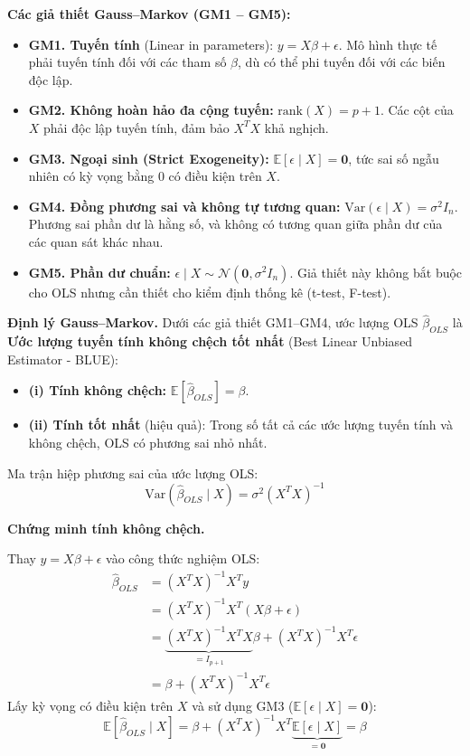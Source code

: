 \documentclass[a4paper]{article}
\begin{document}
\textbf{Các giả thiết Gauss--Markov (GM1 -- GM5):}
\begin{itemize}
    \item \textbf{GM1. Tuyến tính} (Linear in parameters): $y = X\beta + \epsilon$. Mô hình thực tế phải tuyến tính đối với các tham số $\beta$, dù có thể phi tuyến đối với các biến độc lập.
    \item \textbf{GM2. Không hoàn hảo đa cộng tuyến:} $\text{rank}(X) = p + 1$. Các cột của $X$ phải độc lập tuyến tính, đảm bảo $X^TX$ khả nghịch.
    \item \textbf{GM3. Ngoại sinh (Strict Exogeneity):} $\mathbb{E}[\epsilon \mid X] = \mathbf{0}$, tức sai số ngẫu nhiên có kỳ vọng bằng 0 có điều kiện trên $X$.
    \item \textbf{GM4. Đồng phương sai và không tự tương quan:} $\text{Var}(\epsilon \mid X) = \sigma^2 I_n$. Phương sai phần dư là hằng số, và không có tương quan giữa phần dư của các quan sát khác nhau.
    \item \textbf{GM5. Phần dư chuẩn:} $\epsilon \mid X \sim \mathcal{N}(\mathbf{0}, \sigma^2 I_n)$. Giả thiết này không bắt buộc cho OLS nhưng cần thiết cho kiểm định thống kê (t-test, F-test).
\end{itemize}

\textbf{Định lý Gauss--Markov.} Dưới các giả thiết GM1--GM4, ước lượng OLS $\hat{\beta}_{OLS}$ là \textbf{Ước lượng tuyến tính không chệch tốt nhất} (Best Linear Unbiased Estimator - BLUE):
\begin{itemize}
    \item \textbf{(i) Tính không chệch:} $\mathbb{E}[\hat{\beta}_{OLS}] = \beta$.
    \item \textbf{(ii) Tính tốt nhất} (hiệu quả): Trong số tất cả các ước lượng tuyến tính và không chệch, OLS có phương sai nhỏ nhất.
\end{itemize}

Ma trận hiệp phương sai của ước lượng OLS:
\begin{equation}
\text{Var}(\hat{\beta}_{OLS} \mid X) = \sigma^2 (X^TX)^{-1}
\end{equation}

\textbf{Chứng minh tính không chệch.}

Thay $y = X\beta + \epsilon$ vào công thức nghiệm OLS:
\begin{align*}
\hat{\beta}_{OLS} &= (X^TX)^{-1}X^Ty \\
                   &= (X^TX)^{-1}X^T(X\beta + \epsilon) \\
                   &= \underbrace{(X^TX)^{-1}X^TX}_{=I_{p+1}}\beta + (X^TX)^{-1}X^T\epsilon \\
                   &= \beta + (X^TX)^{-1}X^T\epsilon
\end{align*}
Lấy kỳ vọng có điều kiện trên $X$ và sử dụng GM3 ($\mathbb{E}[\epsilon \mid X] = \mathbf{0}$):
$$\mathbb{E}[\hat{\beta}_{OLS} \mid X] = \beta + (X^TX)^{-1}X^T \underbrace{\mathbb{E}[\epsilon \mid X]}_{=\mathbf{0}} = \beta$$
\end{document}

